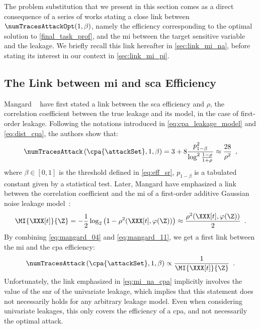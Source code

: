 The problem substitution that we present in this section comes as a direct consequence of a series of works stating a close link between \(\numTracesAttackOpt(1, \beta)\), namely the efficiency corresponding to the optimal solution to \autoref{final_task_prof}, and the \gls{mi} between the target sensitive variable and the leakage.
We briefly recall this link hereafter in \autoref{sec:link_mi_na}, before stating its interest in our context in \autoref{sec:link_mi_pi}.

\subsection{The Link between \gls{mi} and \gls{sca} Efficiency}
\label{sec:link_mi_na}
Mangard \etal{}~\cite{mangard_hardware_2004,mangard_power_2007} have first stated a link between the \gls{sca} efficiency and \(\rho\), the correlation coefficient between the true leakage and its model, in the case of first-order leakage.
Following the notations introduced in \autoref{eq:cpa_leakage_model} and \autoref{eq:dist_cpa}, the authors show that:
\begin{equation}
    \numTracesAttack \left(\cpa{\attackSet}, 1, \beta \right) = 3 + 8 \frac{p_{1-\beta}^2}{\log^2{\frac{1-\rho}{1+\rho}}} \approx \frac{28}{\rho^2} \enspace ,
    \label{eq:mangard_04}
\end{equation}
where \(\beta \in [0,1]\) is the threshold defined in \autoref{eq:eff_sr}, \(p_{1-\beta}\) is a tabulated constant given by a statistical test.
Later, Mangard \etal{} have emphasized a link between the correlation coefficient and the \gls{mi} of a first-order additive Gaussian noise leakage model~\cite{mangard_one_2011}:
\begin{equation}
    \MI{\XXX[t]}{\Z} = -\frac{1}{2} \log_2\left(1 - \rho^2(\XXX[t], \varphi(\Z))\right) \approx \frac{ \rho^2(\XXX[t], \varphi(\Z))}{2} \enspace .
    \label{eq:mangard_11}
\end{equation}
By combining \autoref{eq:mangard_04} and \autoref{eq:mangard_11}, we get a first link between the \gls{mi} and the \gls{cpa} efficiency:
\begin{equation}
    \numTracesAttack \left(\cpa{\attackSet}, 1, \beta \right) \propto \frac{1}{\MI{\XXX[t]}{\Z}} \enspace .
    \label{eq:mi_na_cpa}
\end{equation}
Unfortunately, the link emphasized in \autoref{eq:mi_na_cpa} implicitly involves the value of the \gls{snr} of the univariate leakage, which implies that this statement does not necessarily holds for any arbitrary leakage model.
Even when considering univariate leakages, this only covers the efficiency of a \gls{cpa}, and not necessarily the optimal attack.

